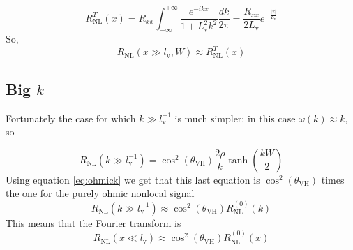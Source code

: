 \begin{equation}
    R_{\textrm{NL}}^T(x)=
    R_{xx}\int_{-\infty}^{+\infty}
    \frac {e^{-ikx}}{1+L_\textrm{v}^2k^2}
    \frac {dk}{2\pi}=
    \frac{R_{xx}}{2L_\textrm{v}}e^{-\frac{|x|}{L_\textrm{v}}}
\end{equation}
So,
\begin{equation}
    R_{\textrm{NL}}(x\gg l_\textrm{v},W)\approx R_{\textrm{NL}}^T(x)
    \label{eq:rxg}
\end{equation}

\subsection{Big $k$}
Fortunately the case for which $k\gg l_\textrm{v}^{-1}$ is much simpler: in this case $\omega(k) \approx k$, so

\begin{equation}
    R_{\textrm{NL}}(k\gg l_\textrm{v}^{-1})=\cos^2(\theta_{\textrm{VH}})\frac {2\rho}{k}\tanh\left(\frac{kW}2\right)
\end{equation}
Using equation \ref{eq:ohmick} we get that this last equation is $\cos^2(\theta_{\textrm{VH}})$ times the one for the purely ohmic nonlocal signal
\begin{equation}
    R_{\textrm{NL}}(k\gg l_\textrm{v}^{-1})\approx
    \cos^2(\theta_{\textrm{VH}})R_{\textrm{NL}}^{(0)}(k)
\end{equation}
This means that the Fourier transform is
\begin{equation}
    R_{\textrm{NL}}(x\ll l_\textrm{v})\approx\cos^2(\theta_{\textrm{VH}})R_{\textrm{NL}}^{(0)}(x)
    \label{eq:rxl}
\end{equation}
